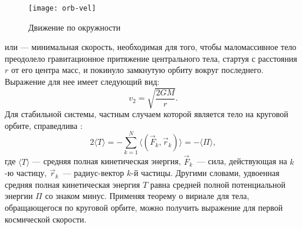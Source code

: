 \begin{wrapfigure}[10]{r}{.5\tw}
	\centering
	\vspace{-1pc}
	\texttt{[image: orb-vel]}
	\caption{Движение по окружности \label{pic:orb-vel}}
\end{wrapfigure}

 или  --- 
минимальная скорость, необходимая для того, чтобы маломассивное тело преодолело гравитационное притяжение центрального тела, стартуя с расстояния $r$ от его центра масс, и покинуло замкнутую орбиту вокруг 
последнего. Выражение для нее имеет следующий вид:\begin{equation}
v_{2}=\sqrt{\frac{2GM}{r}}.
\end{equation}
Для стабильной системы, частным случаем которой является тело на круговой орбите, справедлива 
:
\begin{equation}
2 \langle T\rangle 
= -\sum _{{k=1}}^{N}\langle (\vec{F}_{k}, \vec{r}_{k})\rangle 
= -\langle \Pi \rangle,
\end{equation}
где $\langle T\rangle$ --- средняя полная кинетическая энергия, $\vec{F}_k$~--- сила, 
действующая на $k$-ю частицу, $\vec{r}_k$~--- радиус-вектор $k$-й частицы. Другими словами, удвоенная средняя полная 
кинетическая энергия $T$ равна средней полной потенциальной энергии $\Pi$ со знаком минус. Применяя теорему о вириале для тела, обращающегося по круговой орбите, можно 
получить выражение для первой космической скорости.